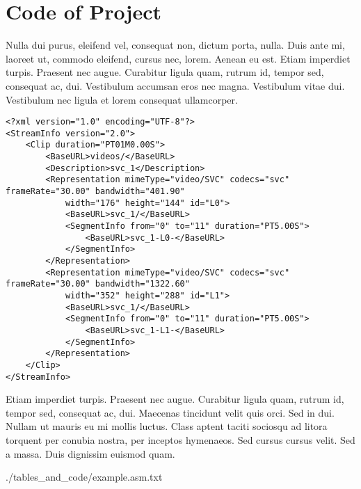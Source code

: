 \chapter{Code of Project}
\label{chapter:appendixA}

Nulla dui purus, eleifend vel, consequat non, dictum porta, nulla. Duis ante mi, laoreet ut, commodo eleifend, cursus nec, lorem. Aenean eu est. Etiam imperdiet turpis. Praesent nec augue. Curabitur ligula quam, rutrum id, tempor sed, consequat ac, dui. Vestibulum accumsan eros nec magna. Vestibulum vitae dui. Vestibulum nec ligula et lorem consequat ullamcorper. 

\begin{lstlisting}[frame=lines,style=XML,caption={Example of a XML file.},label=xmlEx]
<?xml version="1.0" encoding="UTF-8"?>
<StreamInfo version="2.0">
    <Clip duration="PT01M0.00S">
        <BaseURL>videos/</BaseURL>
        <Description>svc_1</Description>
        <Representation mimeType="video/SVC" codecs="svc" frameRate="30.00" bandwidth="401.90"
            width="176" height="144" id="L0">
            <BaseURL>svc_1/</BaseURL>
            <SegmentInfo from="0" to="11" duration="PT5.00S">
                <BaseURL>svc_1-L0-</BaseURL>
            </SegmentInfo>
        </Representation>
        <Representation mimeType="video/SVC" codecs="svc" frameRate="30.00" bandwidth="1322.60"
            width="352" height="288" id="L1">
            <BaseURL>svc_1/</BaseURL>
            <SegmentInfo from="0" to="11" duration="PT5.00S">
                <BaseURL>svc_1-L1-</BaseURL>
            </SegmentInfo>
        </Representation>
    </Clip>
</StreamInfo>
\end{lstlisting}

Etiam imperdiet turpis. Praesent nec augue. Curabitur ligula quam, rutrum id, tempor sed, consequat ac, dui. Maecenas tincidunt velit quis orci. Sed in dui. Nullam ut mauris eu mi mollis luctus. Class aptent taciti sociosqu ad litora torquent per conubia nostra, per inceptos hymenaeos. Sed cursus cursus velit. Sed a massa. Duis dignissim euismod quam.

\begin{spacing}{0.5}

{./tables_and_code/example.asm.txt}
\end{spacing}


